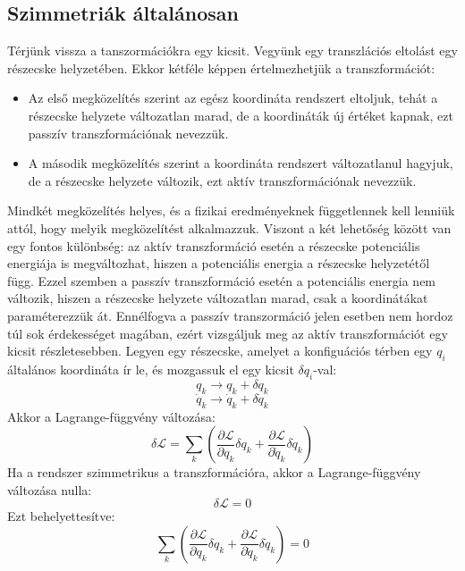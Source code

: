 \documentclass[../main.tex]{subfiles}
\begin{document}
\subsection{Szimmetriák általánosan}
Térjünk vissza a tanszormációkra egy kicsit. Vegyünk egy transzlációs eltolást egy részecske helyzetében. Ekkor kétféle képpen értelmezhetjük a transzformációt:
\begin{itemize}
    \item Az első megközelítés szerint az egész koordináta rendszert eltoljuk, tehát a részecske helyzete változatlan marad, de a koordináták új értéket kapnak, ezt passzív transzformációnak nevezzük.
    \item A második megközelítés szerint a koordináta rendszert változatlanul hagyjuk, de a részecske helyzete változik, ezt aktív transzformációnak nevezzük.
\end{itemize}
Mindkét megközelítés helyes, és a fizikai eredményeknek függetlennek kell lenniük attól, hogy melyik megközelítést alkalmazzuk. Viszont a két lehetőség között van egy fontos különbség: az aktív transzformáció
esetén a részecske potenciális energiája is megváltozhat, hiszen a potenciális energia a részecske helyzetétől függ. Ezzel szemben a passzív transzformáció esetén a potenciális energia nem változik, hiszen a részecske helyzete változatlan marad,
csak a koordinátákat paraméterezzük át. Ennélfogva a passzív transzormáció jelen esetben nem hordoz túl sok érdekességet magában, ezért vizsgáljuk meg az aktív transzformációt egy kicsit részletesebben.
Legyen egy részecske, amelyet a konfiguációs térben egy $q_i$ általános koordináta ír le, és mozgassuk el egy kicsit $\delta q_i$-val:
\begin{equation}
    q_k \to q_k + \delta q_k
\end{equation}
\begin{equation}
    \dot{q}_k \to \dot{q}_k + \delta \dot{q}_k
\end{equation}
Akkor a Lagrange-függvény változása:
\begin{equation}
    \delta \mathcal{L} = \sum_k \left( \frac{\partial \mathcal{L}}{\partial q_k} \delta q_k + \frac{\partial \mathcal{L}}{\partial \dot{q}_k} \delta \dot{q}_k \right)
\end{equation}
Ha a rendszer szimmetrikus a transzformációra, akkor a Lagrange-függvény változása nulla:
\begin{equation}
    \delta \mathcal{L} = 0
\end{equation}
Ezt behelyettesítve:
\begin{equation}
    \sum_k \left( \frac{\partial \mathcal{L}}{\partial q_k} \delta q_k + \frac{\partial \mathcal{L}}{\partial \dot{q}_k} \delta \dot{q}_k \right) = 0
\end{equation}
\end{document}
